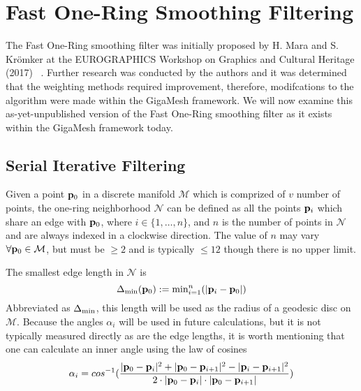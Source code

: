 \chapter{Fast One-Ring Smoothing Filtering}
The Fast One-Ring smoothing filter was initially proposed by H. Mara and S. Krömker at the EUROGRAPHICS Workshop on Graphics and Cultural Heritage (2017) ~\cite[s.~3.2]{Mara17}. Further research was conducted by the authors and it was determined that the weighting methods required improvement, therefore, modifcations to the algorithm were made within the GigaMesh framework. We will now examine this as-yet-unpublished version of the Fast One-Ring smoothing filter as it exists within the GigaMesh framework today.
%
\section{Serial Iterative Filtering}
Given a point $\mathbf{p}_0$ in a discrete manifold $\mathcal{M}$ which is comprized of $v$ number of points, the one-ring neighborhood $\mathcal{N}$ can be defined as all the points $\mathbf{p}_i$ which share an edge with $\mathbf{p}_0$, where $i \in \{1, \ldots, n\}$, and $n$ is the number of points in $\mathcal{N}$ and are always indexed in a clockwise direction. The value of $n$ may vary $\forall \mathbf{p}_0 \in \mathcal{M}$, but must be $\geq 2$ and is typically $\leq 12$ though there is no upper limit.%
%
%
%
%
%
%
%

The smallest edge length in $\mathcal{N}$ is 
\begin{equation}
	\Delta_\text{min}(\mathbf{p}_0) := \text{min}^n_{i=1} (|\mathbf{p}_i - \mathbf{p}_0|)
	\label{eq:localMinimumEdgeLength}
\end{equation}
%
Abbreviated as $\Delta_\text{min}$, this length will be used as the radius of a geodesic disc \todoCitation on $\mathcal{M}$.
%
Because the angles $\alpha_i$ will be used in future calculations, but it is not typically measured directly as are the edge lengths, it is worth mentioning that one can calculate an inner angle using the law of cosines
\begin{equation}
	\alpha_i = cos^{-1}(\frac{|\mathbf{p}_0 - \mathbf{p}_{i}|^2 + |\mathbf{p}_0 - \mathbf{p}_{i+1}|^2 - |\mathbf{p}_i - \mathbf{p}_{i+1}|^2}{2\cdot|\mathbf{p}_0 - \mathbf{p}_{i}|\cdot|\mathbf{p}_0 - \mathbf{p}_{i+1}|})
	\label{eq:alphaFromEdgeLengths}
\end{equation}
%

